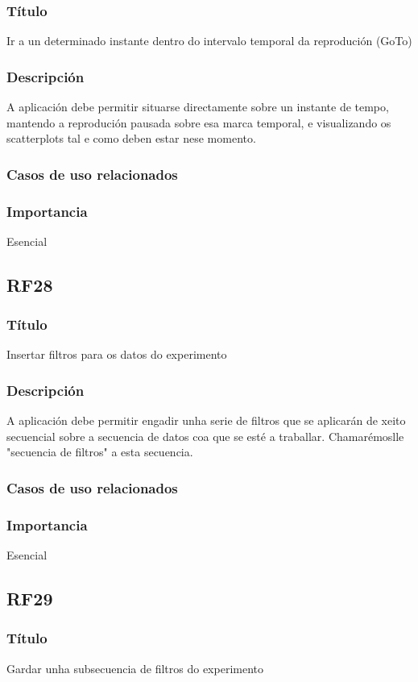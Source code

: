\subsubsection{Título}
Ir a un determinado instante dentro do intervalo temporal da reprodución (GoTo)
\subsubsection{Descripción}
A aplicación debe permitir situarse directamente sobre un instante de tempo, mantendo a reprodución pausada sobre esa marca temporal, e visualizando os scatterplots tal e como deben estar nese momento.
\subsubsection{Casos de uso relacionados}
\subsubsection{Importancia}
Esencial

\subsection{RF28}
\subsubsection{Título}
Insertar filtros para os datos do experimento
\subsubsection{Descripción}
A aplicación debe permitir engadir unha serie de filtros que se aplicarán de xeito secuencial sobre a secuencia de datos coa que se esté a traballar. Chamarémoslle "secuencia de filtros" a esta secuencia.
\subsubsection{Casos de uso relacionados}
\subsubsection{Importancia}
Esencial

\subsection{RF29}
\subsubsection{Título}
Gardar unha subsecuencia de filtros do experimento
